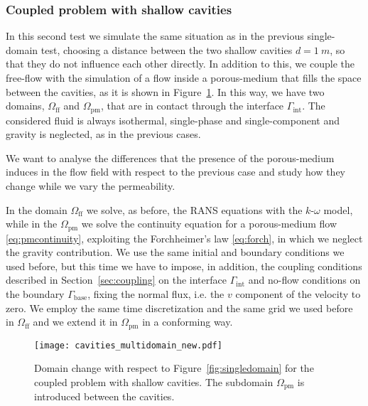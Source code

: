 \subsubsection{Coupled problem with shallow cavities}
In this second test we simulate the same situation as in the previous 
single-domain test, 
choosing a distance between the two shallow cavities $d=\SI{1}{m}$, so that they do not influence each other directly. In addition to this, we couple the free-flow with the simulation of a flow inside a porous-medium that fills the space between 
the cavities, as it is shown in Figure~\ref{fig:multidomain}. In this way, we 
have two domains, $\Omega_\text{ff}$ and $\Omega_\text{pm}$, that are in contact through the 
interface $\Gamma_\text{int}$. The considered fluid is always isothermal, single-phase and single-component and gravity is neglected, as in the previous cases.

We want to analyse the differences that the presence of the porous-medium 
induces in the flow field with respect to the previous case and study how they 
change while we vary the permeability.

In the domain $\Omega_\text{ff}$ we solve, as before, the RANS equations with the 
$k\text{-}\omega$ model, while in the $\Omega_\text{pm}$ we solve the continuity equation
for a porous-medium flow \eqref{eq:pmcontinuity}, exploiting the Forchheimer's law \eqref{eq:forch}, in which we neglect the gravity contribution.
We use the same initial and boundary conditions we used before, but this time 
we have to impose, in addition, the coupling conditions described in 
Section~\ref{sec:coupling} on the interface 
$\Gamma_\text{int}$ and no-flow conditions on the boundary $\Gamma_\text{base}$, fixing the normal flux, i.e. the $v$ component of the velocity to zero.
We employ the same time discretization and the same grid we used before in $\Omega_\text{ff}$ and we extend it in 
$\Omega_\text{pm}$ in a conforming way.
\begin{figure}
	\centering
	\texttt{[image: cavities\_multidomain\_new.pdf]}
	\caption[Domain change with respect to Figure~\ref{fig:singledomain} for the coupled problem with shallow cavities]{Domain change with respect to Figure~\ref{fig:singledomain} for the coupled problem with shallow cavities. The subdomain $\Omega_\text{pm}$ is introduced between the cavities.}
	\label{fig:multidomain}
\end{figure}

